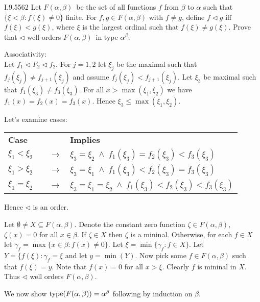 {
\newcommand*{\Fab}{\ensuremath{F(\alpha, \beta)}}
\begin{lexcopy}{I.9.55}{62}
Let \Fab\ be the set of all functions $f$ from
\(\beta\) to \(\alpha\) such
that \(\{\xi < \beta: f(\xi) \neq 0\}\) finite.
For \(f,g \in \Fab\) with \(f \neq g\), define \(f \triangleleft g\)
iff \(f(\xi) < g(\xi)\), where \(\xi\) is the largest ordinal such
that \(f(\xi) \neq g(\xi)\). Prove that
\(\triangleleft\) well-orders \Fab\ in type \(\alpha^\beta\).
\end{lexcopy}

Associativity:\\
Let \(f_1 \triangleleft F_2 \triangleleft f_2\).
For \(j=1,2\) let \(\xi_j\) be the maximal such that
\(f_j(\xi_j) \neq f_{j+1}(\xi_j)\) and
assume \mbox{\(f_j(\xi_j) < f_{j+1}(\xi_j)\)}.
Let \(\xi_3\) be maximal such that \(f_1(\xi_3) \neq f_3(\xi_3)\).
For all \(x>\max(\xi_1,\xi_2)\) we have \(f_1(x)=f_2(x)=f_3(x)\).
Hence \(\xi_3 \leq \max(\xi_1,\xi_2)\).

Let's examine cases:
\begin{center}
\begin{tabular}{l c p{}}\\
\textbf{Case} & & \textbf{Implies} \\
\(\xi_1 < \xi_2\) & \(\quad\rightarrow\) & 
  \(\xi_3=\xi_2 \;\land\; f_1(\xi_3)=f_2(\xi_3)<f_3(\xi_3)\)\\
\(\xi_1 > \xi_2\) & \(\quad\rightarrow\) & 
  \(\xi_3=\xi_1 \;\land\; f_1(\xi_3)<f_2(\xi_3)=f_3(\xi_3)\)\\
\(\xi_1 = \xi_2\) & \(\quad\rightarrow\) & 
  \(\xi_3=\xi_1=\xi_2\;\land\; f_1(\xi_3)<f_2(\xi_3)<f_3(\xi_3)\)\\
\end{tabular}
\end{center}
Hence \(\triangleleft\) is an order.

Let \(\emptyset\neq X \subseteq \Fab\).
Denote the constant zero function \(\zeta\in \Fab\), \(\zeta(x)=0\)
for all \(x\in\beta\). If \(\zeta \in X\) then \(\zeta\) is a mininal.
Otherwise,
for each \(f\in X\) let \(\gamma_f=\max\{x\in \beta: f(x)\neq 0\}\).
Let \(\xi = \min\{\gamma_f: f\in X\}\).
Let \(Y = \{f(\xi): \gamma_f = \xi\) and
let \(y = \min(Y)\). Now pick some \(f\in \Fab\)
such that \(f(\xi)=y\). Note that \(f(x)=0\) for all \(x>\xi\).
Clearly $f$ is mininal in $X$.
Thus \(\triangleleft\) well orders \Fab.

We now show \(\type(\Fab) = \alpha^\beta\) following \cite{WangFrederic}
by induction on \(\beta\).

}
